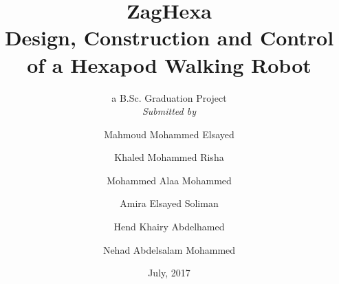 \titlehead{\centering\texttt{[image: myFrontMatter/figures/zuLogo]}
    \texttt{[image: myFrontMatter/figures/engLogo]}}

\subject{Zagazig University, Faculty of Engineering,\\
    Computer and Systems Engineering Dept.}

\title{ZagHexa\\
    Design, Construction and Control\\
    of a Hexapod Walking Robot}

\subtitle{\vspace{2cm}a B.Sc. Graduation Project\\
\emph{Submitted by}}

\author{
    Mahmoud Mohammed Elsayed
\and{Khaled Mohammed  Risha} 
\and{Mohammed Alaa Mohammed} 
\and{Amira Elsayed Soliman} 
\and{Hend Khairy Abdelhamed} 
\and{Nehad Abdelsalam Mohammed}}

\date{July, 2017}

\publishers{Submitted to The  Computer and Systems Engineering Dept., Faculty of Engineering, Zagazig University, Egypt}


\uppertitleback{Graduation Project Report to be submitted to\\
Zagazig University, faculty of Engineering\\
in partial fulfillment of the requirements for the degree \\
Bachelor of Science in Engineering (B.Sc.)\\
}



\lowertitleback{\textbf{Date of Presentation}\\
  24. Juni 2015\\~\\
  
  \textbf{Supervisors}\\
Dr.Ing. \textbf{Mohammed Nour Abdel Gwad Ahmed}\\
\footnotesize{\itshape 
 Computer and Systems Engineering Department,\\
  Faculty of Engineering, Zagazig University, Egypt}\\~\\
Dr. \textbf{Ahmed Hamdy Hassanien}\\
\footnotesize{\itshape ~~ Mechanical Engineering Department, \\
    Faculty of Engineering, Zagazig University, Egypt}\\

\textbf{Defense Commete}\\
Prof. Dr. Xyz Wuv\\
Prof. Dr. Abc Def}